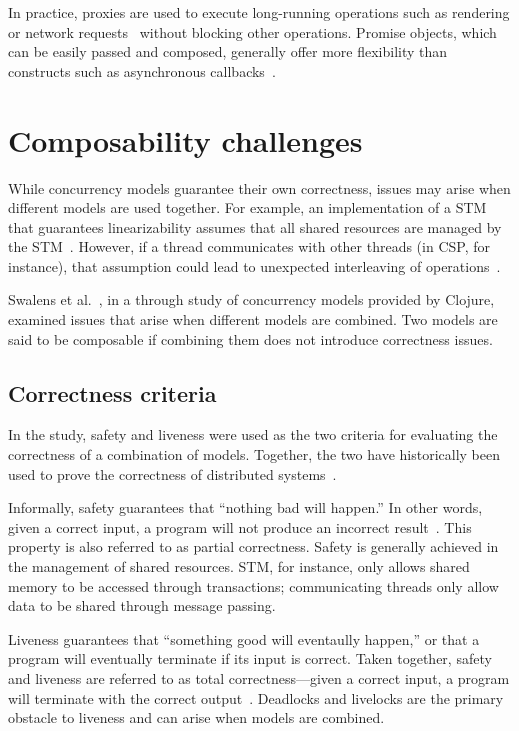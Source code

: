 \documentclass{sig-alternate}
\begin{document}
In practice, proxies are used to execute long-running operations such as rendering or network requests~\cite{Swalens2014} without blocking other operations. Promise objects, which can be easily passed and composed, generally offer more flexibility than constructs such as asynchronous callbacks~\cite{Kambona2013}.

\section{Composability challenges}

While concurrency models guarantee their own correctness, issues may arise when different models are used together. For example, an implementation of a STM that guarantees linearizability assumes that all shared resources are managed by the STM~\cite{Shavit1995}. However, if a thread communicates with other threads (in CSP, for instance), that assumption could lead to unexpected interleaving of operations~\cite{Swalens2014}.

Swalens et al.~\cite{Swalens2014}, in a through study of concurrency models provided by Clojure, examined issues that arise when different models are combined. Two models are said to be composable if combining them does not introduce correctness issues.

\subsection{Correctness criteria}

In the study, safety and liveness were used as the two criteria for evaluating the correctness of a combination of models. Together, the two have historically been used to prove the correctness of distributed systems~\cite{Lamport1977}.

Informally, safety guarantees that ``nothing bad will happen.'' In other words, given a correct input, a program will not produce an incorrect result~\cite{Swalens2014}. This property is also referred to as partial correctness. Safety is generally achieved in the management of shared resources. STM, for instance, only allows shared memory to be accessed through transactions; communicating threads only allow data to be shared through message passing.

Liveness guarantees that ``something good will eventaully happen,'' or that a program will eventually terminate if its input is correct. Taken together, safety and liveness are referred to as total correctness---given a correct input, a program will terminate with the correct output~\cite{Swalens2014}. Deadlocks and livelocks are the primary obstacle to liveness and can arise when models are combined.
\end{document}
